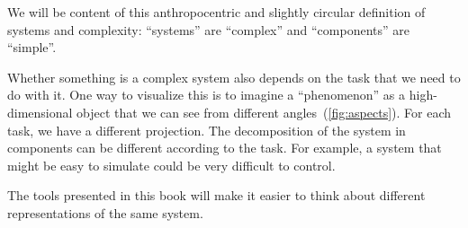 We will be content of this anthropocentric and slightly circular definition of systems and complexity: ``systems'' are ``complex'' and ``components'' are ``simple''.

Whether something is a complex system also depends on the task that we need to do with it.
One way to visualize this is to imagine a ``phenomenon'' as a high-dimensional object that we can see from different angles~(\cref{fig:aspects}).
For each task, we have a different projection.
The decomposition of the system in components can be different according to the task.
For example, a system that might be easy to simulate could be very difficult to control.



The tools presented in this book will make it easier to think about different representations of the same system.






